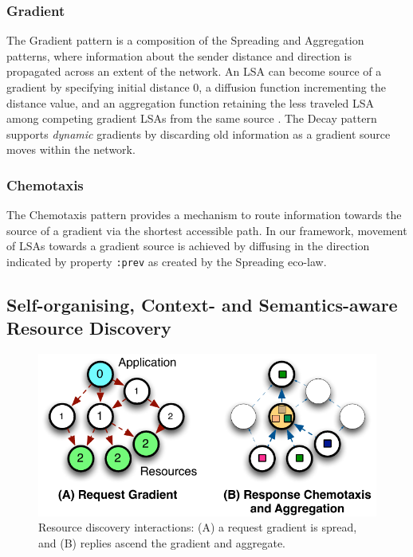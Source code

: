 \documentclass[12pt,a4paper,twoside,openright]{book}
\begin{document}
\subsubsection{Gradient}
The Gradient pattern is a composition of the Spreading and Aggregation patterns, where information about the sender distance and direction is propagated across an extent of the network.
%
An LSA can become source of a gradient by specifying initial distance $0$, a diffusion function incrementing the distance value, and an aggregation function retaining the less traveled LSA among competing gradient LSAs from the same source \cite{sapereecolaws-sac2012}.
%
The Decay pattern supports \emph{dynamic} gradients by discarding old information as a gradient source moves within the network.

\subsubsection{Chemotaxis}
The Chemotaxis pattern provides a mechanism to route information towards the source of a gradient via the shortest accessible path.
%
In our framework, movement of LSAs towards a gradient source is achieved by diffusing in the direction indicated by property \texttt{:prev} as created by the Spreading eco-law.

\subsection{Self-organising, Context- and Semantics-aware Resource Discovery}
\begin{figure}
\centering
\includegraphics[width=\columnwidth]{img/newprocess}
\caption[Resource discovery interactions]{Resource discovery interactions: (A) a request gradient is spread, and (B) replies ascend the gradient and aggregate.} 
\label{fig:distributed_interaction}
\end{figure}
\end{document}

